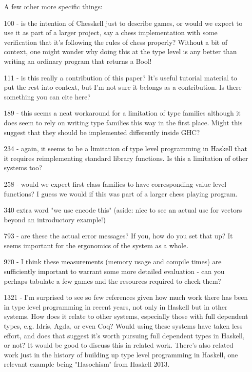 A few other more specific things:

100 - is the intention of Chesskell just to describe games, or would we expect to use it as part of a larger project, say a chess implementation with some verification that it's following the rules of chess properly? Without a bit of context, one might wonder why doing this at the type level is any better than writing an ordinary program that returns a Bool!

111 - is this really a contribution of this paper? It's useful tutorial material to put the rest into context, but I'm not sure it belongs as a contribution. Is there something you can cite here?

189 - this seems a neat workaround for a limitation of type families although it does seem to rely on writing type families this way in the first place. Might this suggest that they should be implemented differently inside GHC?

234 - again, it seems to be a limitation of type level programming in Haskell that it requires reimplementing standard library functions. Is this a limitation of other systems too?

258 - would we expect first class families to have corresponding value level functions? I guess we would if this was part of a larger chess playing program.

340 extra word "we use encode this" (aside: nice to see an actual use for vectors beyond an introductory example!)

793 - are these the actual error messages? If you, how do you set that up? It seems important for the ergonomics of the system as a whole.

970 - I think these measurements (memory usage and compile times) are sufficiently important to warrant some more detailed evaluation - can you perhaps tabulate a few games and the resources required to check them?

1321 - I'm surprised to see so few references given how much work there has been in type level programming in recent years, not only in Haskell but in other systems. How does it relate to other systems, especially those with full dependent types, e.g. Idris, Agda, or even Coq? Would using these systems have taken less effort, and does that suggest it's worth pursuing full dependent types in Haskell, or not? It would be good to discuss this in related work. There's also related work just in the history of building up type level programming in Haskell, one relevant example being "Hasochism" from Haskell 2013.

